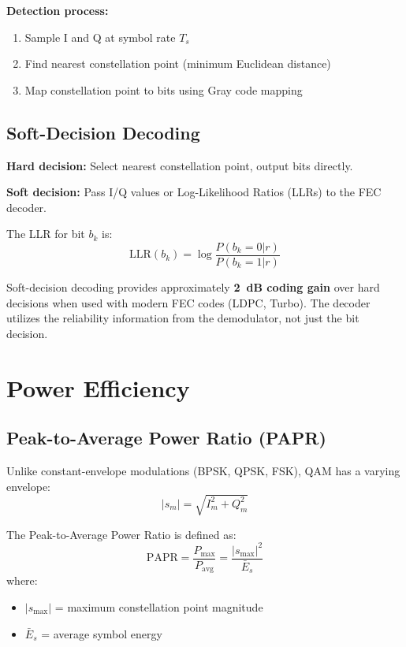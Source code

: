 \textbf{Detection process:}
\begin{enumerate}
\item Sample I and Q at symbol rate $T_s$
\item Find nearest constellation point (minimum Euclidean distance)
\item Map constellation point to bits using Gray code mapping
\end{enumerate}

\subsection{Soft-Decision Decoding}

\textbf{Hard decision:} Select nearest constellation point, output bits directly.

\textbf{Soft decision:} Pass I/Q values or Log-Likelihood Ratios (LLRs) to the FEC decoder.

The LLR for bit $b_k$ is:
\begin{equation}
\text{LLR}(b_k) = \log\frac{P(b_k=0 | r)}{P(b_k=1 | r)}
\label{eq:qam-llr-simple}
\end{equation}

\begin{keyconcept}
Soft-decision decoding provides approximately \textbf{2~dB coding gain} over hard decisions when used with modern FEC codes (LDPC, Turbo). The decoder utilizes the reliability information from the demodulator, not just the bit decision.
\end{keyconcept}

\section{Power Efficiency}

\subsection{Peak-to-Average Power Ratio (PAPR)}

Unlike constant-envelope modulations (BPSK, QPSK, FSK), QAM has a varying envelope:
\begin{equation}
|s_m| = \sqrt{I_m^2 + Q_m^2}
\label{eq:qam-envelope}
\end{equation}

The Peak-to-Average Power Ratio is defined as:
\begin{equation}
\text{PAPR} = \frac{P_{\max}}{P_{\text{avg}}} = \frac{|s_{\max}|^2}{\bar{E}_s}
\label{eq:qam-papr}
\end{equation}
where:
\begin{itemize}
\item $|s_{\max}|$ = maximum constellation point magnitude
\item $\bar{E}_s$ = average symbol energy
\end{itemize}

